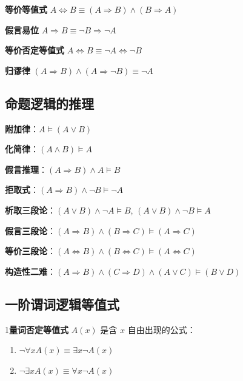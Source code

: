 	\textbf{等价等值式} $A \Leftrightarrow B  \equiv (A \Rightarrow B) \land (B \Rightarrow A)$
	
	\textbf{假言易位} $A \Rightarrow B  \equiv \neg B \Rightarrow \neg A$
	
	\textbf{等价否定等值式} $A \Leftrightarrow B  \equiv \neg A \Leftrightarrow \neg B$
	
	\textbf{归谬律} $(A \Rightarrow B) \land (A \Rightarrow \neg B)  \equiv \neg A$
	
	\subsection*{命题逻辑的推理}
	
	\textbf{附加律}：$A \vDash (A \vee B)$
	
	\textbf{化简律}：$(A \land B) \vDash A$
	
	\textbf{假言推理}：$(A \Rightarrow B) \land A \vDash B$
	
	\textbf{拒取式}：$(A \Rightarrow B) \land \neg B \vDash \neg A$
	
	\textbf{析取三段论}：$(A \vee B) \land \neg A \vDash B$, $(A \vee B) \land \neg B \vDash A$
	
	\textbf{假言三段论}：$(A \Rightarrow B) \land (B \Rightarrow C) \vDash (A \Rightarrow C)$
	
	\textbf{等价三段论}：$(A \Leftrightarrow B) \land (B \Leftrightarrow C) \vDash (A \Leftrightarrow C)$
	
	\textbf{构造性二难}：$(A \Rightarrow B) \land (C \Rightarrow D) \land (A \vee C) \vDash (B \vee D)$
	
	\subsection*{一阶谓词逻辑等值式}
	
	1\textbf{量词否定等值式} $A(x)$ 是含 $x$ 自由出现的公式：
	\begin{enumerate}
		\item $\neg \forall x A(x)  \equiv \exists x \neg A(x)$
		\item $\neg \exists x A(x)  \equiv \forall x \neg A(x)$
	\end{enumerate}
	
